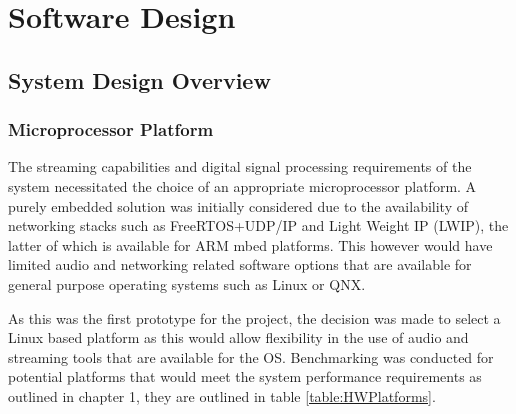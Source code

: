 \documentclass[main.tex]{subfiles}
\begin{document}
\chapter{Software Design}

\section{System Design Overview}
\subsection{Microprocessor Platform}
The streaming capabilities and digital signal processing requirements of the system necessitated the choice of an appropriate microprocessor platform. 
A purely embedded solution was initially considered due to the availability of networking stacks such as FreeRTOS+UDP/IP and Light Weight IP (LWIP), the latter of which is available for ARM mbed platforms. This however would have limited audio and networking related software options that are available for general purpose operating systems such as Linux or QNX.

\medskip
As this was the first prototype for the project, the decision was made to select a Linux based platform as this would allow flexibility in the use of audio and streaming tools that are available for the OS. Benchmarking was conducted for potential platforms that would meet the system performance requirements as outlined in chapter 1, they are outlined in table \ref{table:HWPlatforms}.
\end{document}
